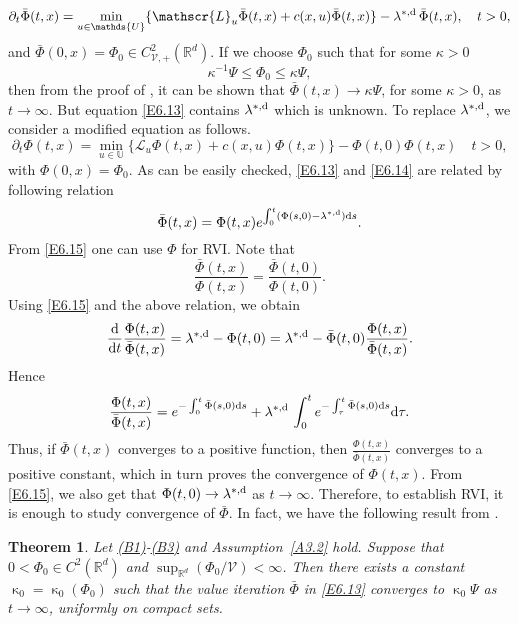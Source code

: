 \documentclass[notitlepage,11pt,reqno]{amsart}
\numberwithin{equation}{section}
\theoremstyle{plain}
\newtheorem{theorem}{Theorem}[section]
\theoremstyle{definition}
\theoremstyle{remark}
\newcommand{\Act}{{\mathds{U}}}
\newcommand{\sL}{{\mathscr{L}}}
\newcommand{\Lyap}{{\mathscr{V}}}   %
\newcommand{\lamstrdf}{\lambda^{*,{\rm d}}}
\newcommand{\Rd}{{\mathds{R}^{d}}}
\newcommand{\D}{\mathrm{d}} %
\begin{document}
\begin{equation}\label{E6.13}
\partial_t \bar\Phi(t, x)= \min_{u\in\Act}\{\sL_u \bar\Phi(t, x) + c(x, u)\bar\Phi(t, x)\}-\lamstrdf\,\bar\Phi(t, x),\quad t>0,
\end{equation}
and $\bar\Phi(0, x)=\Phi_0\in C^2_{\Lyap, +}(\Rd)$. If we choose $\Phi_0$ such that for some $\kappa>0$
$$\kappa^{-1}\Psi\leq\Phi_0\leq \kappa \Psi,$$
then from the proof of \cite[Theorem~3.2]{MR4276001}, it can be shown that $\bar\Phi(t, x)\to \kappa\Psi$, for some $\kappa>0$, as $t\to\infty$. But equation \eqref{E6.13} contains $\lamstrdf$ which 
is unknown. To replace $\lamstrdf$, we consider a modified equation as follows.
\begin{equation}\label{E6.14}
\partial_t \Phi(t, x)= \min_{u\in\Act}\{\sL_u \Phi(t, x) + c(x, u)\Phi(t, x)\}-\Phi(t,0)\Phi(t, x)\quad t>0,
\end{equation}
with $\Phi(0, x)=\Phi_0$. As can be easily checked, \eqref{E6.13} and \eqref{E6.14} are related by following relation
\begin{equation}\label{E6.15}
\bar\Phi(t,x)=\Phi(t,x) e^{\int_0^t(\Phi(s, 0)-\lamstrdf)\D{s} }.
\end{equation}
From \eqref{E6.15} one can use $\Phi$ for RVI. Note that 
$$\frac{\bar\Phi(t, x)}{\Phi(t, x)}=\frac{\bar\Phi(t, 0)}{\Phi(t, 0)}.$$
Using \eqref{E6.15} and the above relation,
we obtain
\begin{align*}
\frac{\D}{\D{t}}\frac{\Phi(t, x)}{\bar\Phi(t, x)}
= \lamstrdf - \Phi(t, 0)= \lamstrdf - \bar\Phi(t, 0)\frac{\Phi(t, x)}{\bar\Phi(t, x)}.
\end{align*}
Hence
$$\frac{\Phi(t, x)}{\bar\Phi(t, x)}= e^{-\int_0^t\bar\Phi(s, 0)\D{s}}
+ \lamstrdf\,\int_0^t e^{-\int_\tau^t\bar\Phi(s, 0)\D{s}}\D\tau.$$
Thus, if $\bar\Phi(t, x)$ converges to a positive function, then
$\frac{\Phi(t, x)}{\bar\Phi(t, x)}$ converges to a positive constant,
which in turn proves the convergence of $\Phi(t, x)$. From \eqref{E6.15},
we also get that $\Phi(t, 0)\to\lamstrdf$ as $t\to\infty$.
Therefore, to establish RVI, it is enough to study convergence of
$\bar\Phi$.
In fact, we have the following result from \cite[Theorem~3.4]{MR4276001}.
\begin{theorem}
Let \hyperlink{B1}{(B1)}-\hyperlink{B3}{(B3)} and Assumption~\ref{A3.2} hold.
Suppose that $0<\Phi_0\in C^2(\Rd)$ and $\sup_{\Rd}\left(\Phi_0/\Lyap\right)<\infty$.
Then there exists a constant $\upkappa_0=\upkappa_0(\Phi_0)$ such that the
value iteration $\bar\Phi$ in \eqref{E6.13} converges to $\upkappa_0\Psi$
as $t\to\infty$, uniformly on compact sets.
\end{theorem}
\end{document}
